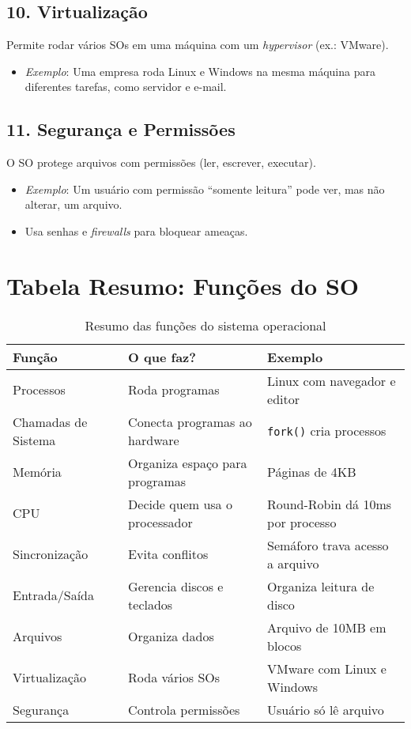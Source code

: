 \documentclass[a4paper,12pt]{article}
\begin{document}
\subsection*{10. Virtualização}

Permite rodar vários SOs em uma máquina com um \textit{hypervisor} (ex.: VMware).

\begin{itemize}
    \item \textit{Exemplo}: Uma empresa roda Linux e Windows na mesma máquina para diferentes tarefas, como servidor e e-mail.
\end{itemize}

\subsection*{11. Segurança e Permissões}

O SO protege arquivos com permissões (ler, escrever, executar).

\begin{itemize}
    \item \textit{Exemplo}: Um usuário com permissão ``somente leitura'' pode ver, mas não alterar, um arquivo.
    \item Usa senhas e \textit{firewalls} para bloquear ameaças.
\end{itemize}

\section*{Tabela Resumo: Funções do SO}

\begin{table}[h]
\centering
\begin{tabular}{|l|p{5cm}|p{4cm}|}
\hline
\textbf{Função} & \textbf{O que faz?} & \textbf{Exemplo} \\
\hline
Processos & Roda programas & Linux com navegador e editor \\
Chamadas de Sistema & Conecta programas ao hardware & \texttt{fork()} cria processos \\
Memória & Organiza espaço para programas & Páginas de 4KB \\
CPU & Decide quem usa o processador & Round-Robin dá 10ms por processo \\
Sincronização & Evita conflitos & Semáforo trava acesso a arquivo \\
Entrada/Saída & Gerencia discos e teclados & Organiza leitura de disco \\
Arquivos & Organiza dados & Arquivo de 10MB em blocos \\
Virtualização & Roda vários SOs & VMware com Linux e Windows \\
Segurança & Controla permissões & Usuário só lê arquivo \\
\hline
\end{tabular}
\caption{Resumo das funções do sistema operacional}
\end{table}
\end{document}
